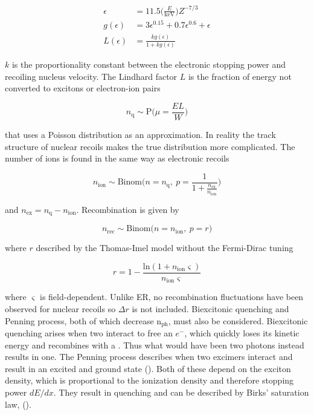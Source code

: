 \begin{subequations}
\begin{align}
\epsilon &= 11.5 \bigg( \frac{E}{\mathrm{keV}} \bigg) Z^{-7/3} \\
g( \epsilon ) &= 3 \epsilon ^{0.15} + 0.7 \epsilon ^{0.6} + \epsilon \\
L( \epsilon ) &= \frac{k g( \epsilon ) }{1 + k g( \epsilon )}
\end{align}
\label{eq:er_nr_calibrations_parameter_determ_nr_lindhard}
\end{subequations}

$k$ is the proportionality constant between the electronic stopping power and recoiling nucleus velocity.  The Lindhard factor
$L$ is the fraction of energy not converted to excitons or electron-ion pairs

\begin{equation}
n_{\mathrm{q}} \sim \mathrm{P} \bigg( \mu = \frac{E L}{W} \bigg)
\label{eq:er_nr_calibrations_parameter_determ_nr_quanta}
\end{equation}

\noindent that uses a Poisson distribution as an approximation.  In reality the track structure of nuclear recoils makes the true
distribution more complicated.  The number of ions is found in the same way as electronic recoils

\begin{equation}
n_{\mathrm{ion}} \sim \mathrm{Binom} \Bigg(n = n_{\mathrm{q}},\ p = \frac{1}{1 + \frac{n_{\mathrm{ex}}}{n_{\mathrm{ion}}}} \Bigg)
\end{equation}

\noindent and $n_{\mathrm{ex}} = n_{\mathrm{q}} - n_{\mathrm{ion}}$.  Recombination is given by

\begin{equation}
n_{\mathrm{rec}} \sim \mathrm{Binom} \big(n = n_{\mathrm{ion}},\ p = r \big)
\end{equation}

\noindent where $r$ described by the Thomas-Imel model without the Fermi-Dirac tuning

\begin{equation}
r = 1 - \frac{\mathrm{ln} (1 + n_{\mathrm{ion}} \varsigma)}{n_{\mathrm{ion}} \varsigma}
\end{equation}

\noindent where $\varsigma$ is field-dependent.  Unlike ER, no recombination fluctuations have been observed for nuclear recoils so
$\Delta r$ is not included.  Biexcitonic quenching and Penning process, both of which decrease
$\mathrm{n_{ph}}$, must also be considered.  Biexcitonic quenching arises when two
 interact to free an $e^-$, which quickly loses its kinetic energy
and recombines with a .  Thus what would have been two photons instead results in one.  The Penning process describes when
two excimers interact and result in an excited and ground state ().  Both of these depend on the exciton density, which
is proportional to the ionization density and therefore stopping power $dE / dx$.  They result in quenching and can be
described by Birks' saturation law,  ().

